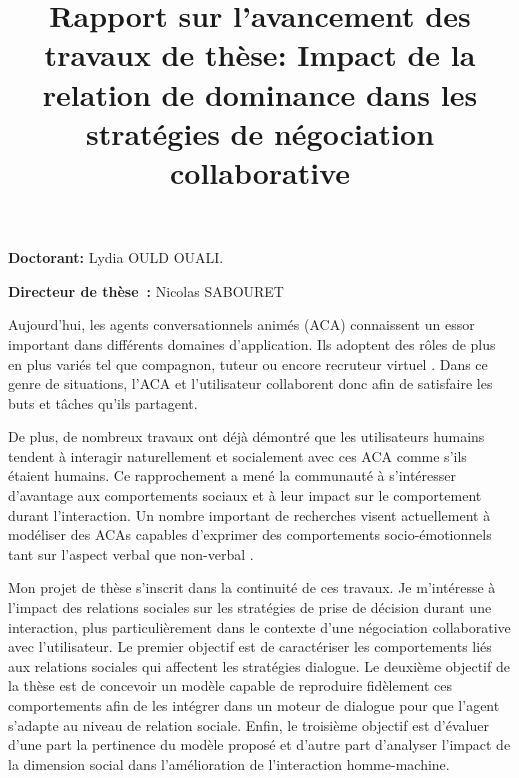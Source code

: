 \documentclass  [french] {article}
\begin{document}
		\title{\vskip -10pt Rapport sur l’avancement des travaux de thèse: Impact de la relation de dominance dans les stratégies de négociation collaborative}
				\maketitle
		
	\textbf{Doctorant:} Lydia OULD OUALI.
	\vspace{1em}


	\textbf{Directeur de thèse :} Nicolas SABOURET
	\vspace{1em}
	
	
	
	
	\par Aujourd’hui, les agents conversationnels animés (ACA) connaissent un essor important dans différents domaines d’application. Ils adoptent des rôles de plus en plus variés tel que compagnon, tuteur  ou encore recruteur virtuel \cite{bickmore2005establishing,kerly2008calmsystem}. Dans ce genre de situations, l'ACA et l'utilisateur collaborent donc afin de satisfaire les buts et tâches qu'ils partagent.
	
	De plus, de nombreux travaux ont déjà démontré que les utilisateurs humains tendent à interagir naturellement et socialement avec ces ACA comme s’ils étaient humains. Ce rapprochement a mené la communauté à s'intéresser d'avantage aux comportements sociaux et à leur impact sur le comportement durant l'interaction.  Un nombre important de recherches visent actuellement à modéliser des ACAs capables d'exprimer des comportements socio-émotionnels tant sur l'aspect verbal que non-verbal \cite{callejas2014computational,de2011effect,kidd2005sociable}.
	
	Mon projet de thèse s'inscrit dans la continuité de ces travaux. Je m'intéresse à l'impact des relations sociales sur les stratégies de prise de décision durant une interaction, plus particulièrement dans le contexte d'une négociation collaborative avec l'utilisateur. Le premier objectif est de caractériser les comportements liés aux relations sociales qui affectent les stratégies dialogue. Le deuxième objectif de la thèse est de concevoir un modèle capable de reproduire fidèlement ces comportements afin de les intégrer dans un moteur de dialogue pour que l'agent s'adapte au niveau de relation sociale. Enfin, le troisième objectif est d'évaluer d'une part la pertinence du modèle proposé et d'autre part d'analyser l'impact de la dimension social dans l'amélioration de l'interaction homme-machine.  
	
\end{document}
